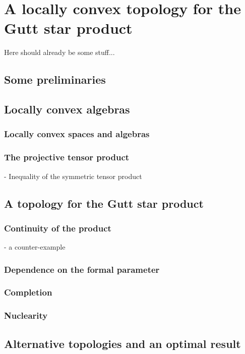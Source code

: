 
%
%

\chapter{A locally convex topology for the Gutt star product}

Here should already be some stuff...

\section{Some preliminaries}
\label{sec:chap5_Prelim}


\section{Locally convex algebras}
\label{sec:chap5_LCAlg}


\subsection{Locally convex spaces and algebras}

\subsection{The projective tensor product}
 - Inequality of the symmetric tensor product



\section{A topology for the Gutt star product}
\label{sec:chap5_TopologyStar}

\subsection{Continuity of the product}
 - a counter-example
 
\subsection{Dependence on the formal parameter}

\subsection{Completion}

\subsection{Nuclearity}



\section{Alternative topologies and an optimal result}
\label{sec:chap5_AlternativeOptimal}
